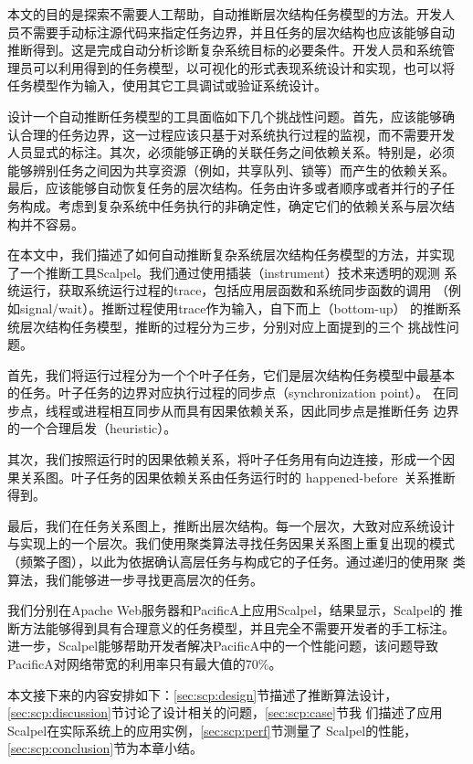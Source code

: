 本文的目的是探索不需要人工帮助，自动推断层次结构任务模型的方法。开发人
员不需要手动标注源代码来指定任务边界，并且任务的层次结构也应该能够自动
推断得到。这是完成自动分析诊断复杂系统目标的必要条件。开发人员和系统管
理员可以利用得到的任务模型，以可视化的形式表现系统设计和实现，也可以将
任务模型作为输入，使用其它工具调试或验证系统设计。

设计一个自动推断任务模型的工具面临如下几个挑战性问题。首先，应该能够确
认合理的任务边界，这一过程应该只基于对系统执行过程的监视，而不需要开发
人员显式的标注。其次，必须能够正确的关联任务之间依赖关系。特别是，必须
能够辨别任务之间因为共享资源（例如，共享队列、锁等）而产生的依赖关系。
最后，应该能够自动恢复任务的层次结构。任务由许多或者顺序或者并行的子任
务构成。考虑到复杂系统中任务执行的非确定性，确定它们的依赖关系与层次结
构并不容易。

在本文中，我们描述了如何自动推断复杂系统层次结构任务模型的方法，并实现
了一个推断工具Scalpel。我们通过使用插装（instrument）技术来透明的观测
系统运行，获取系统运行过程的trace，包括应用层函数和系统同步函数的调用
（例如signal/wait）。推断过程使用trace作为输入，自下而上（bottom-up）
的推断系统层次结构任务模型，推断的过程分为三步，分别对应上面提到的三个
挑战性问题。

首先，我们将运行过程分为一个个叶子任务，它们是层次结构任务模型中最基本
的任务。叶子任务的边界对应执行过程的同步点（synchronization point）。
在同步点，线程或进程相互同步从而具有因果依赖关系，因此同步点是推断任务
边界的一个合理启发（heuristic）。

其次，我们按照运行时的因果依赖关系，将叶子任务用有向边连接，形成一个因
果关系图。叶子任务的因果依赖关系由任务运行时的
happened-before~\cite{lamport_clock}关系推断得到。

最后，我们在任务关系图上，推断出层次结构。每一个层次，大致对应系统设计
与实现上的一个层次。我们使用聚类算法寻找任务因果关系图上重复出现的模式
（频繁子图），以此为依据确认高层任务与构成它的子任务。通过递归的使用聚
类算法，我们能够进一步寻找更高层次的任务。

我们分别在Apache Web服务器和PacificA上应用Scalpel，结果显示，Scalpel的
推断方法能够得到具有合理意义的任务模型，并且完全不需要开发者的手工标注。
进一步，Scalpel能够帮助开发者解决PacificA中的一个性能问题，该问题导致
PacificA对网络带宽的利用率只有最大值的70\%。

本文接下来的内容安排如下：\ref{sec:scp:design}节描述了推断算法设计，
\ref{sec:scp:discussion}节讨论了设计相关的问题，\ref{sec:scp:case}节我
们描述了应用Scalpel在实际系统上的应用实例，\ref{sec:scp:perf}节测量了
Scalpel的性能，\ref{sec:scp:conclusion}节为本章小结。

